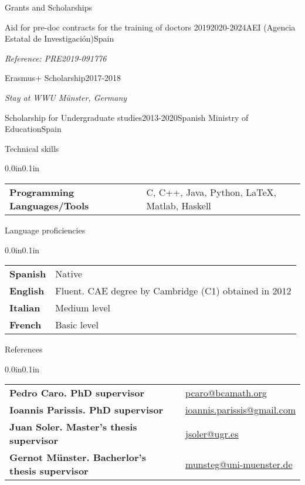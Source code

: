 \documentclass{resume} %
\makeatletter
\newcommand{\italicitem}[1]{\item{\textit{#1}}}
\newcommand{\entry}[2]{#1 & #2 \tabularnewline} %
\newcommand{\tableEnv}[2]{%
  \begin{rSection}{#1} %
    \begin{adjustwidth}{0.0in}{0.1in} %
      \begin{tabularx}{\linewidth}{@{} >{\bfseries}l @{\hspace{6ex}} X @{}}
        #2 %
      \end{tabularx}
    \end{adjustwidth}
  \end{rSection}
}
\makeatother
\begin{document}
\begin{rSection}{Grants and Scholarships}
    \begin{rSubsectionNoBullet}{Aid for pre-doc contracts for the training of doctors 2019}{2020-2024}{AEI (Agencia Estatal de Investigaci\'on)}{Spain}
        \italicitem {Reference: PRE2019-091776}
    \end{rSubsectionNoBullet}
    \begin{rSubsectionNoBullet}{Erasmus+ Scholarship}{2017-2018}{}{}
       \vspace{-.3cm} \italicitem {Stay at WWU M\"unster, Germany}
    \end{rSubsectionNoBullet}
    \begin{rSubsectionNoBullet}{Scholarship for Undergraduate studies}{2013-2020}{Spanish Ministry of Education}{Spain}
        \italicitem {\vspace{-.3cm}}
    \end{rSubsectionNoBullet}
\end{rSection}

\tableEnv{Technical skills}{
    \entry{Programming Languages/Tools}{C, C++, Java, Python, \LaTeX, Matlab, Haskell}
}


\tableEnv{Language proficiencies}{
    \entry{Spanish}{Native}
    \entry{English}{Fluent. CAE degree by Cambridge (C1) obtained in 2012}
    \entry{Italian}{Medium level}
    \entry{French}{Basic level}
}

\tableEnv{References}{
    \entry{Pedro Caro. PhD supervisor}{\href{mailto:pcaro@bcamath.org}{pcaro@bcamath.org}}
    \entry{Ioannis Parissis. PhD supervisor}{\href{mailto:ioannis.parissis@gmail.com}{ioannis.parissis@gmail.com}}
    \entry{Juan Soler. Master's thesis supervisor}{\href{mailto:jsoler@ugr.es}{jsoler@ugr.es}}
    \entry{Gernot M\"unster. Bacherlor's thesis supervisor}{\href{mailto:munsteg@uni-muenster.de}{munsteg@uni-muenster.de}}


}
\end{document}

